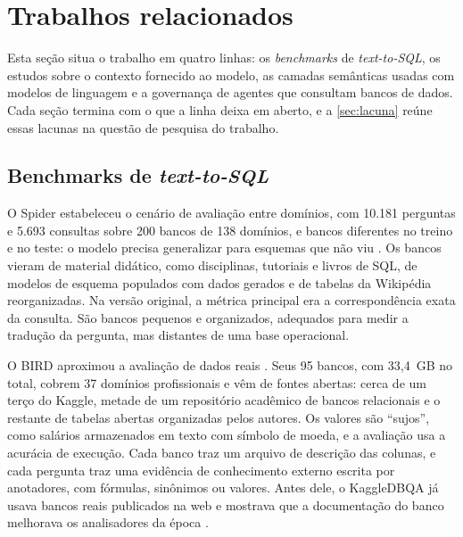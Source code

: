 \chapter{Trabalhos relacionados}
\label{cap:trabalhos-relacionados}

Esta seção situa o trabalho em quatro linhas: os \textit{benchmarks}
de \textit{text-to-SQL}, os estudos sobre o contexto fornecido ao modelo,
as camadas semânticas usadas com modelos de linguagem e a governança de
agentes que consultam bancos de dados. Cada seção termina com o que a
linha deixa em aberto, e a \autoref{sec:lacuna} reúne essas lacunas na
questão de pesquisa do trabalho.

\section{Benchmarks de \textit{text-to-SQL}}
\label{sec:benchmarks}

O Spider estabeleceu o cenário de avaliação entre domínios, com 10.181
perguntas e 5.693 consultas sobre 200 bancos de 138 domínios, e bancos
diferentes no treino e no teste: o modelo precisa generalizar para
esquemas que não viu \cite{yu2018spider}. Os bancos vieram de material
didático, como disciplinas, tutoriais e livros de SQL, de modelos de
esquema populados com dados gerados e de tabelas da Wikipédia
reorganizadas. Na versão original, a métrica principal era a
correspondência exata da consulta. São bancos pequenos e organizados,
adequados para medir a tradução da pergunta, mas distantes de uma base
operacional.

O BIRD aproximou a avaliação de dados reais \cite{li2023bird}. Seus 95
bancos, com 33,4~GB no total, cobrem 37 domínios profissionais e vêm de
fontes abertas: cerca de um terço do Kaggle, metade de um repositório
acadêmico de bancos relacionais e o restante de tabelas abertas
organizadas pelos autores. Os valores são ``sujos'', como salários
armazenados em texto com símbolo de moeda, e a avaliação usa a acurácia
de execução. Cada banco traz um arquivo de descrição das colunas, e cada
pergunta traz uma evidência de conhecimento externo escrita por
anotadores, com fórmulas, sinônimos ou valores. Antes dele, o KaggleDBQA
já usava bancos reais publicados na web e mostrava que a documentação do
banco melhorava os analisadores da época \cite{lee2021kaggledbqa}.

